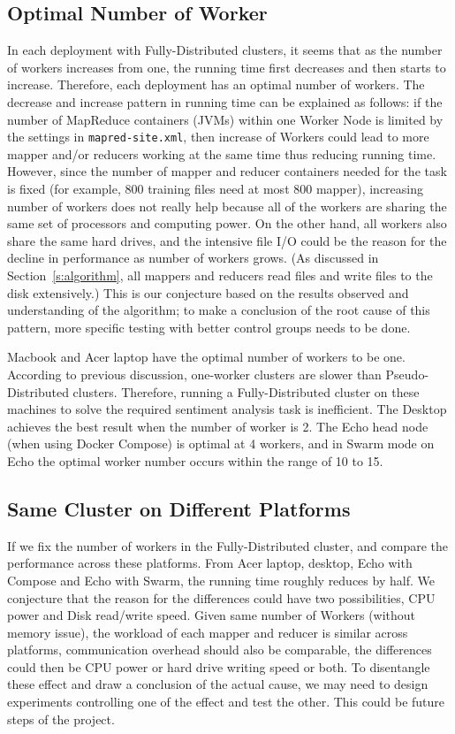 \subsection{Optimal Number of Worker}
In each deployment with Fully-Distributed clusters, it seems that as
the number of workers increases from one, the running time first
decreases and then starts to increase. Therefore, each deployment has
an optimal number of workers. The decrease and increase pattern in
running time can be explained as follows: if the number of MapReduce
containers (JVMs) within one Worker Node is limited by the settings
in \verb|mapred-site.xml|, then increase of Workers could lead to more
mapper and/or reducers working at the same time thus reducing running
time. However, since the number of mapper and reducer containers
needed for the task is fixed (for example, 800 training files need at
most 800 mapper), increasing number of workers does not really help
because all of the workers are sharing the same set of processors and
computing power. On the other hand, all workers also share the same
hard drives, and the intensive file I/O could be the reason for
the decline in performance as number of workers grows.
(As discussed in Section~\ref{s:algorithm}, all mappers and reducers read
files and write files to the disk extensively.) This is our conjecture
based on the results observed and understanding of the algorithm; to
make a conclusion of the root cause of this pattern, more specific
testing with better control groups needs to be done.

Macbook and Acer laptop have the optimal number of workers to be one.
According to previous discussion, one-worker clusters are slower than
Pseudo-Distributed clusters. Therefore, running a Fully-Distributed
cluster on these machines to solve the required sentiment analysis
task is inefficient.  The Desktop achieves the best result when the
number of worker is 2. The Echo head node (when using Docker Compose)
is optimal at 4 workers, and in Swarm mode on Echo the optimal worker
number occurs within the range of 10 to 15.

\subsection{Same Cluster on Different Platforms}

If we fix the number of workers in the Fully-Distributed cluster, and
compare the performance across these platforms. From Acer laptop,
desktop, Echo with Compose and Echo with Swarm, the running time
roughly reduces by half. We conjecture that the reason for the
differences could have two possibilities, CPU power and Disk
read/write speed. Given same number of Workers (without memory issue),
the workload of each mapper and reducer is similar across platforms,
communication overhead should also be comparable, the differences
could then be CPU power or hard drive writing speed or both. To
disentangle these effect and draw a conclusion of the actual cause, we
may need to design experiments controlling one of the effect and test
the other. This could be future steps of the project.

